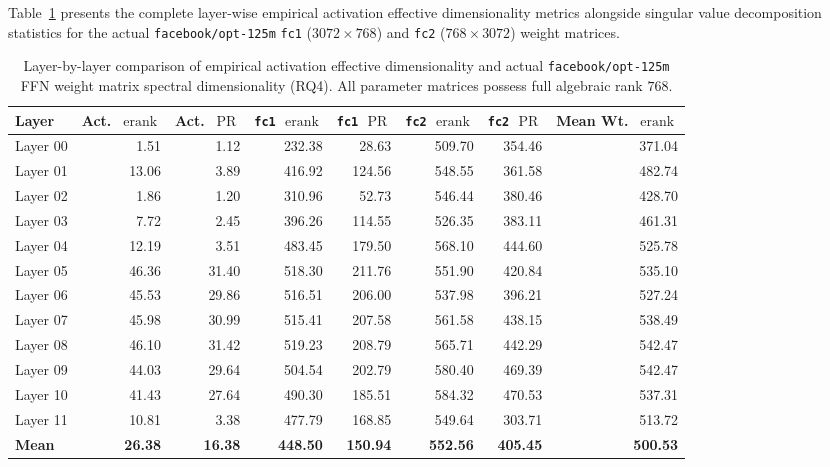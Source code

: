 \documentclass[12pt, a4paper, oneside]{report}
\theoremstyle{definition}
\newcommand{\erank}{\operatorname{erank}}
\newcommand{\PR}{\operatorname{PR}}
\begin{document}
Table~\ref{tab:app_rq4_layer_data} presents the complete layer-wise empirical activation effective dimensionality metrics alongside singular value decomposition statistics for the actual \texttt{facebook/opt-125m} \texttt{fc1} ($3072 \times 768$) and \texttt{fc2} ($768 \times 3072$) weight matrices.

\begin{table}[htbp]
    \centering
    \caption{Layer-by-layer comparison of empirical activation effective dimensionality and actual \texttt{facebook/opt-125m} FFN weight matrix spectral dimensionality (RQ4). All parameter matrices possess full algebraic rank $768$.}
    \label{tab:app_rq4_layer_data}
    \small
    \setlength{\tabcolsep}{5pt}
    \begin{tabular}{@{}l r r r r r r r@{}}
        \toprule
        \textbf{Layer} & \textbf{Act.\ $\erank$} & \textbf{Act.\ $\PR$} & \textbf{\texttt{fc1} $\erank$} & \textbf{\texttt{fc1} $\PR$} & \textbf{\texttt{fc2} $\erank$} & \textbf{\texttt{fc2} $\PR$} & \textbf{Mean Wt.\ $\erank$} \\
        \midrule
        Layer 00 &  1.51 &  1.12 & 232.38 &  28.63 & 509.70 & 354.46 & 371.04 \\
        Layer 01 & 13.06 &  3.89 & 416.92 & 124.56 & 548.55 & 361.58 & 482.74 \\
        Layer 02 &  1.86 &  1.20 & 310.96 &  52.73 & 546.44 & 380.46 & 428.70 \\
        Layer 03 &  7.72 &  2.45 & 396.26 & 114.55 & 526.35 & 383.11 & 461.31 \\
        Layer 04 & 12.19 &  3.51 & 483.45 & 179.50 & 568.10 & 444.60 & 525.78 \\
        Layer 05 & 46.36 & 31.40 & 518.30 & 211.76 & 551.90 & 420.84 & 535.10 \\
        Layer 06 & 45.53 & 29.86 & 516.51 & 206.00 & 537.98 & 396.21 & 527.24 \\
        Layer 07 & 45.98 & 30.99 & 515.41 & 207.58 & 561.58 & 438.15 & 538.49 \\
        Layer 08 & 46.10 & 31.42 & 519.23 & 208.79 & 565.71 & 442.29 & 542.47 \\
        Layer 09 & 44.03 & 29.64 & 504.54 & 202.79 & 580.40 & 469.39 & 542.47 \\
        Layer 10 & 41.43 & 27.64 & 490.30 & 185.51 & 584.32 & 470.53 & 537.31 \\
        Layer 11 & 10.81 &  3.38 & 477.79 & 168.85 & 549.64 & 303.71 & 513.72 \\
        \midrule
        \textbf{Mean} & \textbf{26.38} & \textbf{16.38} & \textbf{448.50} & \textbf{150.94} & \textbf{552.56} & \textbf{405.45} & \textbf{500.53} \\
        \bottomrule
    \end{tabular}
\end{table}
\end{document}
